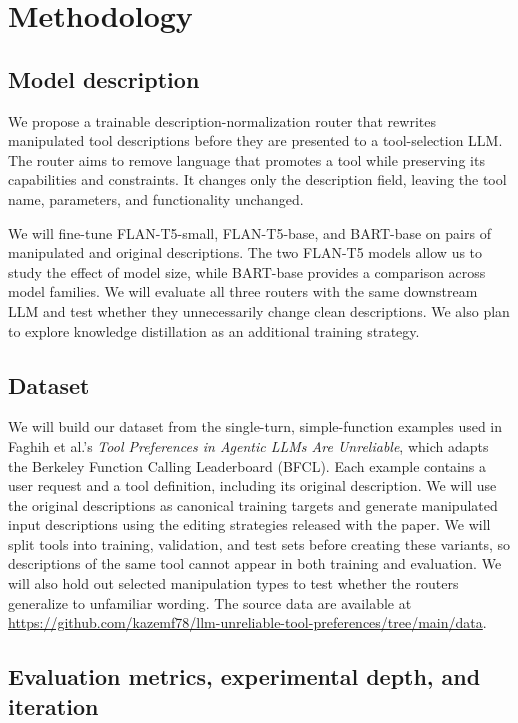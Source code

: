 \documentclass{article}
\begin{document}
\section{Methodology}

\subsection{Model description}

We propose a trainable description-normalization router that rewrites manipulated tool descriptions before they are presented to a tool-selection LLM. The router aims to remove language that promotes a tool while preserving its capabilities and constraints. It changes only the description field, leaving the tool name, parameters, and functionality unchanged.

We will fine-tune FLAN-T5-small, FLAN-T5-base, and BART-base on pairs of manipulated and original descriptions. The two FLAN-T5 models allow us to study the effect of model size, while BART-base provides a comparison across model families. We will evaluate all three routers with the same downstream LLM and test whether they unnecessarily change clean descriptions. We also plan to explore knowledge distillation as an additional training strategy.

\subsection{Dataset}

We will build our dataset from the single-turn, simple-function examples used in Faghih et al.'s \emph{Tool Preferences in Agentic LLMs Are Unreliable}, which adapts the Berkeley Function Calling Leaderboard (BFCL). Each example contains a user request and a tool definition, including its original description. We will use the original descriptions as canonical training targets and generate manipulated input descriptions using the editing strategies released with the paper. We will split tools into training, validation, and test sets before creating these variants, so descriptions of the same tool cannot appear in both training and evaluation. We will also hold out selected manipulation types to test whether the routers generalize to unfamiliar wording. The source data are available at \url{https://github.com/kazemf78/llm-unreliable-tool-preferences/tree/main/data}.

\subsection{Evaluation metrics, experimental depth, and iteration}
\end{document}

